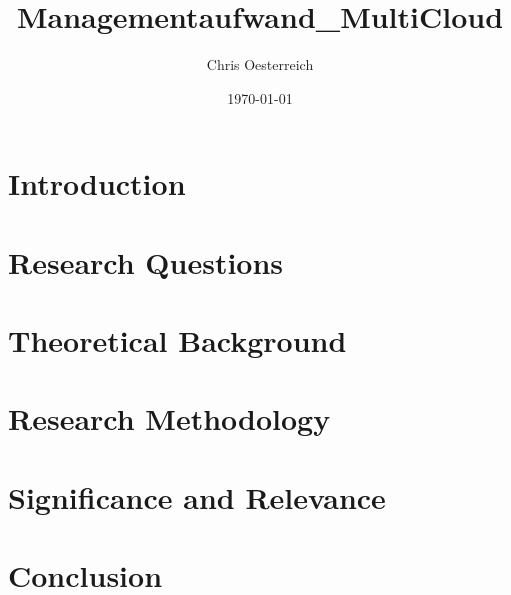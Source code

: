 \documentclass[12pt]{article}
\title{Managementaufwand_MultiCloud}
\author{Chris Oesterreich}
\date{\today}
\begin{document}
    
    \newpage

    \tableofcontents
    \newpage

    \section{Introduction}
        
    
    \section{Research Questions} 
        
    
    \section{Theoretical Background}
        
    
    \section{Research Methodology}
        
    
    \section{Significance and Relevance}
        

    \section{Conclusion}
        
    
    \newpage
    \printbibliography
\end{document}

